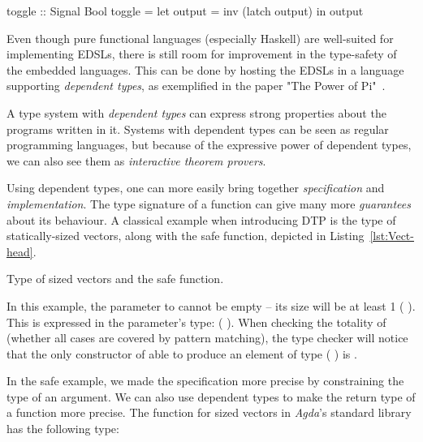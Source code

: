     \begin{haskellcode}
        toggle :: Signal Bool
        toggle = let output = inv (latch output) in output
    \end{haskellcode}

    Even though pure functional languages (especially Haskell) are well-suited for implementing \acp{EDSL},
    there is still room for improvement in the type-safety of the embedded languages.
    This can be done by hosting the \acp{EDSL} in a language supporting \emph{dependent types},
    as exemplified in the paper "The Power of Pi"~\cite{power-pi}.

    A type system with \emph{dependent types} can express strong properties about the programs written in it.
    Systems with dependent types can be seen as regular programming languages,
    but because of the expressive power of dependent types, we can also see them as \emph{interactive theorem provers}.

    Using dependent types, one can more easily bring together \emph{specification} and \emph{implementation}.
    The type signature of a function can give many more \emph{guarantees} about its behaviour.
    A classical example when introducing \ac{DTP} is the type of statically-sized vectors,
    along with the safe  function, depicted in Listing~\ref{lst:Vect-head}.

    \begin{listing}[h]
        \caption{Type of sized vectors and the safe  function. \label{lst:Vect-head}}
    \end{listing}

    In this example, the parameter to  cannot be empty – its size will be at least 1 ( ).
    This is expressed in the parameter's type:   ( ).
    When checking the totality of  (whether all cases are covered by pattern matching),
    the type checker will notice that the only constructor of 
    able to produce an element of type   ( ) is .

    In the safe  example, we made the specification more precise by constraining the type of an argument.
    We can also use dependent types to make the return type of a function more precise.
    The  function for sized vectors in \emph{Agda}'s standard library has the following type:

